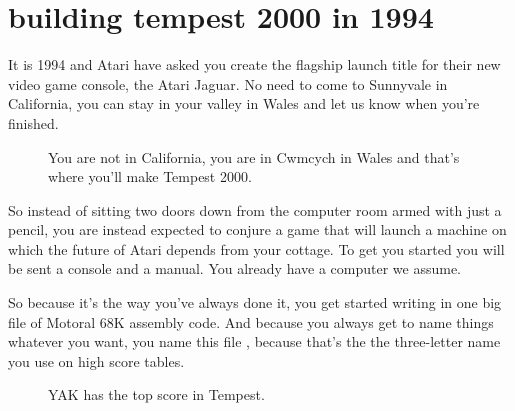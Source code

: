 \chapter{building tempest 2000 in 1994}
\label{sec:building_t2k}
\lstset{style=68KStyle}
\lhead[tempest 2000]{}

It is 1994 and Atari have asked you create the flagship launch title for their new video game console,
the Atari Jaguar. No need to come to Sunnyvale in California, you can stay in your valley in Wales and
let us know when you're finished.

\begin{figure}[H]
      \centering
    \caption{You are not in California, you are in Cwmcych in Wales and that's where you'll make Tempest 2000.}
\end{figure}

So instead of sitting two doors down from the computer room armed with just a pencil, you are instead 
expected to conjure a game that will launch a machine on which the future of Atari depends from your cottage.
To get you started you will be sent a console and a manual. You already have a computer we assume.

So because it's the way you've always done it, you get started writing  in one big file
of Motoral 68K assembly code.
And because you always get to name things whatever you want, you name this file , because that's the 
the three-letter name you use on high score tables.

\begin{figure}[H]
      \centering
    \caption{YAK has the top score in Tempest.}
\end{figure}

